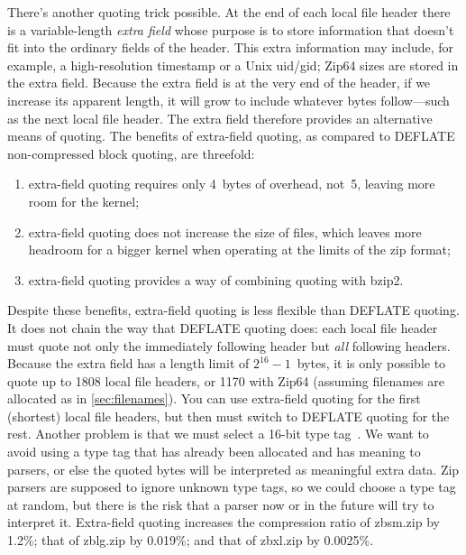 \documentclass[letterpaper,twocolumn,10pt]{article}
\begin{document}
There's another quoting trick possible.
At the end of each local file header
there is a variable-length
\emph{extra field} whose purpose is to store information
that doesn't fit into the ordinary fields of the header.
This extra information may include, for example,
a high-resolution timestamp or a Unix uid/gid;
Zip64 sizes are stored in the extra field.
Because the extra field is at the very end of the header,
if we increase its apparent length,
it will grow to include whatever bytes follow---such
as the next local file header.
The extra field therefore provides an alternative means of quoting.
The benefits of extra-field quoting,
as compared to DEFLATE non-compressed block quoting,
are threefold:
\begin{enumerate}
\item extra-field quoting requires only \SI{4}{bytes} of overhead,
not~\num{5}, leaving more room for the kernel;
\item extra-field quoting does not increase the size of files,
which leaves more headroom for a bigger kernel when
operating at the limits of the zip format;
\item extra-field quoting provides a way of combining quoting with bzip2.
\end{enumerate}
Despite these benefits, extra-field quoting is less flexible
than DEFLATE quoting.
It does not chain the way that DEFLATE quoting does:
each local file header must quote not only the immediately following header
but \emph{all} following headers.
Because the extra field has a length limit of
$2^{16}-1$~bytes,
it is only possible to quote up to \num{1808}
local file headers,
or \num{1170} with Zip64
(assuming filenames are allocated as in \autoref{sec:filenames}).
You can use extra-field quoting for the first (shortest) local file headers,
but then must switch to DEFLATE quoting for the rest.
Another problem is that we must select a 16-bit type tag~\cite[\S 4.5.2]{appnote}.
We want to avoid using a type tag that has already been allocated
and has meaning to parsers, or else the quoted bytes will be interpreted
as meaningful extra data.
Zip parsers are supposed to ignore unknown type tags,
so we could choose a type tag at random,
but there is the risk that a parser now or in the future
will try to interpret it.
Extra-field quoting increases the compression ratio of
zbsm.zip by 1.2\%;
that of zblg.zip by 0.019\%;
and that of zbxl.zip by 0.0025\%.
\end{document}
